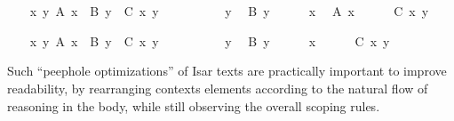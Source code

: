 \begin{isabellebody}
\begin{minipage}{0.5\textwidth}
\endisatagproof
{\isafoldproof}%
%
\isadelimproof
%
\endisadelimproof
%
\isadelimnoproof
\ %
\endisadelimnoproof
%
\isatagnoproof
{}\isamarkupfalse%
%
\endisatagnoproof
{\isafoldnoproof}%
%
\isadelimnoproof
%
\endisadelimnoproof
\isanewline
%
\isadelimproof
\ \ %
\endisadelimproof
%
\isatagproof
{}\isamarkupfalse%
%
\end{minipage}\\[3ex]\begin{minipage}{0.5\textwidth}
\ \ \isamarkupfalse%
\ {\isachardoublequoteopen}{\isasymAnd}x\ y{\isachardot}\ A\ x\ {\isasymLongrightarrow}\ B\ y\ {\isasymLongrightarrow}\ C\ x\ y{\isachardoublequoteclose}\isanewline
\ \ \isamarkupfalse%
\ {\isacharminus}\isanewline
\ \ \ \ \isamarkupfalse%
\ y\ \isamarkupfalse%
\ {\isachardoublequoteopen}B\ y{\isachardoublequoteclose}\isanewline
\ \ \ \ \isamarkupfalse%
\ x\ \isamarkupfalse%
\ {\isachardoublequoteopen}A\ x{\isachardoublequoteclose}\isanewline
\ \ \ \ \isamarkupfalse%
\ {\isachardoublequoteopen}C\ x\ y{\isachardoublequoteclose}\ \isamarkupfalse%
\isanewline
\ \ \isamarkupfalse%
%
\end{minipage}\begin{minipage}{0.5\textwidth}
\ \ \isamarkupfalse%
\ {\isachardoublequoteopen}{\isasymAnd}x\ y{\isachardot}\ A\ x\ {\isasymLongrightarrow}\ B\ y\ {\isasymLongrightarrow}\ C\ x\ y{\isachardoublequoteclose}\isanewline
\ \ \isamarkupfalse%
\ {\isacharminus}\isanewline
\ \ \ \ \isamarkupfalse%
\ y\ \isamarkupfalse%
\ {\isachardoublequoteopen}B\ y{\isachardoublequoteclose}\isanewline
\ \ \ \ \isamarkupfalse%
\ x\isanewline
\ \ \ \ \isamarkupfalse%
\ {\isachardoublequoteopen}C\ x\ y{\isachardoublequoteclose}\ \isamarkupfalse%
\isanewline
\ \ \isamarkupfalse%
%
\endisatagproof
{\isafoldproof}%
%
\isadelimproof
%
\endisadelimproof
%
\end{minipage}
%
\begin{isamarkuptext}%
\medskip\noindent Such ``peephole optimizations'' of Isar texts are
  practically important to improve readability, by rearranging
  contexts elements according to the natural flow of reasoning in the
  body, while still observing the overall scoping rules.


\end{isamarkuptext}
\end{isabellebody}
